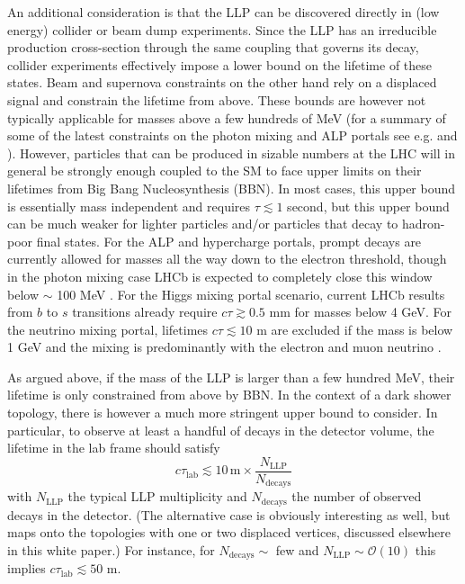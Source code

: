 An additional consideration is that the LLP can be discovered directly in (low energy) collider or beam dump experiments. Since the LLP has an irreducible production cross-section through the same coupling that governs its decay, collider experiments effectively impose a lower bound on the lifetime of these states. Beam and supernova constraints on the other hand rely on a displaced signal and constrain the lifetime from above. These bounds are however not typically applicable for masses above a few hundreds of MeV (for a summary of some of the latest constraints on the photon mixing and ALP portals see e.g. \cite{Ilten:2018crw} and \cite{Bauer:2017ris}).   However, particles that can be produced in sizable numbers at the LHC will in general be strongly enough coupled to the SM to face upper limits on their lifetimes from Big Bang Nucleosynthesis (BBN).   In most cases, this upper bound is essentially mass independent and requires $\tau\lesssim 1$ second, but this upper bound can be much weaker for lighter particles and/or particles that decay to hadron-poor final states.  For the ALP and hypercharge portals, prompt decays are currently allowed for masses all the way down to the electron threshold, though in the photon mixing case LHCb is expected to completely close this window below $\sim$ 100 MeV \cite{Ilten:2015hya,Ilten:2016tkc}. For the Higgs mixing portal scenario, current LHCb results from $b$ to $s$ transitions \cite{Aaij:2015tna,Aaij:2016qsm} already require $c\tau \gtrsim 0.5$ mm for masses below 4 GeV. For the neutrino mixing portal, lifetimes $c\tau\lesssim 10$ m are excluded if the mass is below 1 GeV and the mixing is predominantly with the electron and muon neutrino \cite{Deppisch:2015qwa}.

As argued above, if the mass of the LLP is larger than a few hundred MeV, their lifetime is only constrained from above by BBN. In the context of a dark shower topology, there is however a much more stringent upper bound to consider. In particular, to observe at least a handful of decays in the detector volume, the lifetime in the lab frame should satisfy
\begin{equation}
c\tau_{\text{lab}} \lesssim 10 \,\text{m}\times \frac{N_{\text{LLP}}}{N_{\text{decays}}}
\end{equation}
with $N_{\text{LLP}}$ the typical LLP multiplicity and $N_{\text{decays}}$ the number of observed decays in the detector. (The alternative case is obviously interesting as well, but maps onto the topologies with one or two displaced vertices, discussed elsewhere in this white paper.) For instance, for $N_{\text{decays}}\sim$ few and $N_{\text{LLP}}\sim \mathcal{O}(10)$ this implies $c\tau_{\text{lab}}\lesssim 50$ m. 

